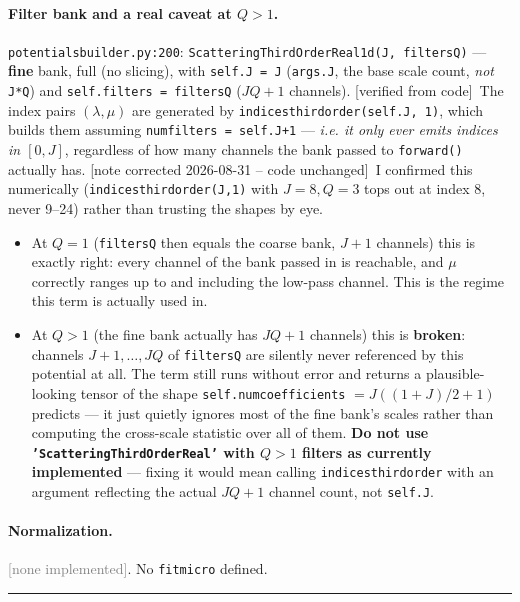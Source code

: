 \documentclass[11pt]{article}
\newcommand{\code}[1]{\texttt{#1}}
\renewcommand{\_}{\origunderscore\allowbreak} %
\newcommand{\verified}{\textcolor{blue!50!black}{[verified from code]}}
\newcommand{\none}{\textcolor{gray}{[none implemented]}}
\newcommand{\notefix}{\textcolor{orange!70!black}{[note corrected 2026-08-31 -- code unchanged]}}
\begin{document}
\paragraph{Filter bank and a real caveat at $Q>1$.} \code{potentials\_builder.py:200}:
\code{Scattering\_Third\_Order\_Real\_1d(J, filters\_Q)} — \textbf{fine} bank,
full (no slicing), with \code{self.J = J} (\code{args.J}, the base scale count,
\emph{not} \code{J*Q}) and \code{self.filters = filters\_Q} ($JQ+1$ channels).
\verified\ The index pairs $(\lambda,\mu)$ are generated by
\code{indices\_third\_order(self.J, 1)}, which builds them assuming
\code{num\_filters = self.J+1} — \emph{i.e. it only ever emits indices in
$[0, J]$}, regardless of how many channels the bank passed to \code{forward()}
actually has. \notefix\ I confirmed this numerically
(\code{indices\_third\_order(J,1)} with $J{=}8,Q{=}3$ tops out at index 8, never
9--24) rather than trusting the shapes by eye.
\begin{itemize}
  \item At \textbf{$Q=1$} (\code{filters\_Q} then equals the coarse bank, $J+1$
        channels) this is exactly right: every channel of the bank passed in is
        reachable, and $\mu$ correctly ranges up to and including the low-pass
        channel. This is the regime this term is actually used in.
  \item At \textbf{$Q>1$} (the fine bank actually has $JQ+1$ channels) this is
        \textbf{broken}: channels $J{+}1,\dots,JQ$ of \code{filters\_Q} are
        silently never referenced by this potential at all. The term still
        runs without error and returns a plausible-looking tensor of the shape
        \code{self.num\_coefficients} $= J((1+J)/2+1)$ predicts — it just
        quietly ignores most of the fine bank's scales rather than computing
        the cross-scale statistic over all of them. \textbf{Do not use
        \code{'Scattering\_Third\_Order\_Real'} with $Q>1$ filters as currently
        implemented} — fixing it would mean calling
        \code{indices\_third\_order} with an argument reflecting the actual
        $JQ+1$ channel count, not \code{self.J}.
\end{itemize}

\paragraph{Normalization.} \none. No \code{fit\_micro} defined.

\bigskip
\hrule
\bigskip
\end{document}
